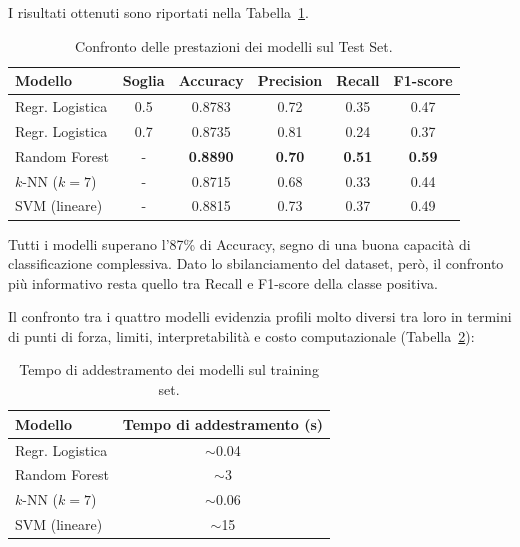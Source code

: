 \documentclass[11pt,a4paper]{article}
\begin{document}
I risultati ottenuti sono riportati nella Tabella~\ref{tab:performance_modelli}.

\begin{table}[H]
\centering
\caption{Confronto delle prestazioni dei modelli sul Test Set.}
\label{tab:performance_modelli}
\begin{tabular}{lccccc}
\toprule
\textbf{Modello} & \textbf{Soglia} & \textbf{Accuracy} & \textbf{Precision} & \textbf{Recall} & \textbf{F1-score} \\
\midrule
Regr. Logistica & 0.5 & 0.8783 & 0.72 & 0.35 & 0.47 \\
Regr. Logistica & 0.7 & 0.8735 & 0.81 & 0.24 & 0.37 \\
Random Forest & - & \textbf{0.8890} & \textbf{0.70} & \textbf{0.51} & \textbf{0.59} \\
$k$-NN ($k=7$) & - & 0.8715 & 0.68 & 0.33 & 0.44 \\
SVM (lineare) & - & 0.8815 & 0.73 & 0.37 & 0.49 \\
\bottomrule
\end{tabular}
\end{table}

Tutti i modelli superano l'87\% di Accuracy, segno di una buona capacità di classificazione complessiva. Dato lo sbilanciamento del dataset, però, il confronto più informativo resta quello tra Recall e F1-score della classe positiva.

Il confronto tra i quattro modelli evidenzia profili molto diversi tra loro in termini di
punti di forza, limiti, interpretabilità e costo computazionale (Tabella~\ref{tab:tempi}):

\begin{table}[H]
\centering
\caption{Tempo di addestramento dei modelli sul training set.}
\label{tab:tempi}
\begin{tabular}{lc}
\toprule
\textbf{Modello} & \textbf{Tempo di addestramento (s)} \\
\midrule
Regr. Logistica & $\sim$0.04 \\
Random Forest & $\sim$3 \\
$k$-NN ($k=7$) & $\sim$0.06 \\
SVM (lineare) & $\sim$15 \\
\bottomrule
\end{tabular}
\end{table}
\end{document}
